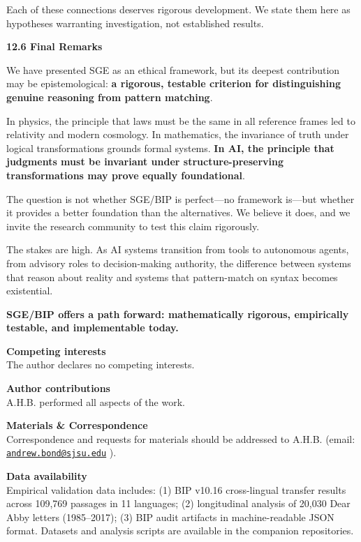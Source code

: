 \documentclass[12pt]{article}
\theoremstyle{plain}
\theoremstyle{definition}
\theoremstyle{remark}
\begin{document}
Each of these connections deserves rigorous development. We state them
here as hypotheses warranting investigation, not established results.

\textbf{12.6 Final Remarks}

We have presented SGE as an ethical framework, but its deepest
contribution may be epistemological: \textbf{a rigorous, testable
criterion for distinguishing genuine reasoning from pattern matching}.

In physics, the principle that laws must be the same in all reference
frames led to relativity and modern cosmology. In mathematics, the
invariance of truth under logical transformations grounds formal
systems. \textbf{In AI, the principle that judgments must be invariant
under structure-preserving transformations may prove equally
foundational}.

The question is not whether SGE/BIP is perfect---no framework is---but
whether it provides a better foundation than the alternatives. We
believe it does, and we invite the research community to test this claim
rigorously.

The stakes are high. As AI systems transition from tools to autonomous
agents, from advisory roles to decision-making authority, the difference
between systems that reason about reality and systems that pattern-match
on syntax becomes existential.

\textbf{SGE/BIP offers a path forward: mathematically rigorous,
empirically testable, and implementable today.}

\textbf{Competing interests}\\
The author declares no competing interests.

\textbf{Author contributions}\\
A.H.B. performed all aspects of the work.

\textbf{Materials \& Correspondence}\\
Correspondence and requests for materials should be addressed to A.H.B.
(email:
\href{mailto:andrew.bond@sjsu.edu}{\nolinkurl{andrew.bond@sjsu.edu}} ).

\textbf{Data availability}\\
Empirical validation data includes: (1) BIP v10.16 cross-lingual
transfer results across 109,769 passages in 11 languages; (2)
longitudinal analysis of 20,030 Dear Abby letters (1985--2017); (3)
BIP audit artifacts in machine-readable JSON format. Datasets and
analysis scripts are available in the companion repositories.
\end{document}
